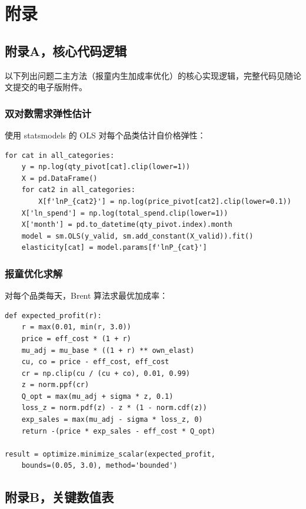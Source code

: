 \newpage
\section{附录}

\subsection{附录A，核心代码逻辑}

以下列出问题二主方法（报童内生加成率优化）的核心实现逻辑，完整代码见随论文提交的电子版附件。

\subsubsection{双对数需求弹性估计}

使用 statsmodels 的 OLS 对每个品类估计自价格弹性：

\begin{verbatim}
for cat in all_categories:
    y = np.log(qty_pivot[cat].clip(lower=1))
    X = pd.DataFrame()
    for cat2 in all_categories:
        X[f'lnP_{cat2}'] = np.log(price_pivot[cat2].clip(lower=0.1))
    X['ln_spend'] = np.log(total_spend.clip(lower=1))
    X['month'] = pd.to_datetime(qty_pivot.index).month
    model = sm.OLS(y_valid, sm.add_constant(X_valid)).fit()
    elasticity[cat] = model.params[f'lnP_{cat}']
\end{verbatim}

\subsubsection{报童优化求解}

对每个品类每天，Brent 算法求最优加成率：

\begin{verbatim}
def expected_profit(r):
    r = max(0.01, min(r, 3.0))
    price = eff_cost * (1 + r)
    mu_adj = mu_base * ((1 + r) ** own_elast)
    cu, co = price - eff_cost, eff_cost
    cr = np.clip(cu / (cu + co), 0.01, 0.99)
    z = norm.ppf(cr)
    Q_opt = max(mu_adj + sigma * z, 0.1)
    loss_z = norm.pdf(z) - z * (1 - norm.cdf(z))
    exp_sales = max(mu_adj - sigma * loss_z, 0)
    return -(price * exp_sales - eff_cost * Q_opt)

result = optimize.minimize_scalar(expected_profit,
    bounds=(0.05, 3.0), method='bounded')
\end{verbatim}

\subsection{附录B，关键数值表}

